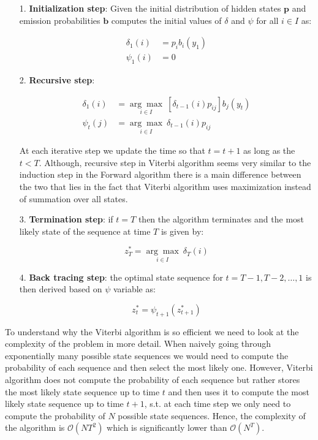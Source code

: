 \begin{itemize}
\item[1.] \textbf{Initialization step}: Given the initial distribution of hidden states $\textbf{p}$ and emission probabilities $\textbf{b}$ computes the initial values 
of $\delta$ and $\psi$ for all $i \in I$ as:

\begin{align}
\delta_1(i) &= p_i b_i(y_1)  \\
\psi_1(i)& = 0
\end{align}

\item[2.] \textbf{Recursive step}:

\begin{align}
\delta_1(i) &= \underset{i \in I}{\arg\max} \: [\delta_{t-1}(i)p_{ij}] b_j(y_t)  \\
\psi_t(j)& = \underset{i \in I}{\arg\max} \: \delta_{t-1}(i)p_{ij}
\end{align}

At each iterative step we update the time so that $t=t+1$ as long as the $t<T$. Although, recursive step in Viterbi algorithm seems very similar to the 
induction step in the Forward algorithm there is a main difference between the two that lies in the fact that Viterbi algorithm uses maximization instead of summation 
over all states. 

\item[3.] \textbf{Termination step}: if $t=T$ then the algorithm terminates and the most likely state of the sequence at time $T$ is given by:

\begin{equation}
z_T^* = \underset{i \in I}{\arg\max} \: \delta_{T}(i)
\end{equation}

\item[4.] \textbf{Back tracing step}: the optimal state sequence for $t = T-1,T-2,\ldots,1$ is then derived based on $\psi$ variable as:

\begin{equation}
z_t^* = \psi_{t+1}(z_{t+1}^*)
\end{equation}

\end{itemize}

To understand why the Viterbi algorithm is so efficient we need to look at the complexity of the problem in more detail. When naively going through exponentially many possible state sequences we would need to compute the probability of each sequence and then select the most likely one. However, Viterbi algorithm does not compute the probability of each sequence but rather stores the most likely state sequence up to time $t$ and then uses it to compute the most likely state sequence up to time $t+1$, s.t. at each time step we only need to compute the probability of $N$ possible state sequences. Hence, the complexity of the algorithm is $\mathcal{O}(NT^2)$ which is significantly lower than $\mathcal{O}(N^T)$. \citep{Bishop2006}

